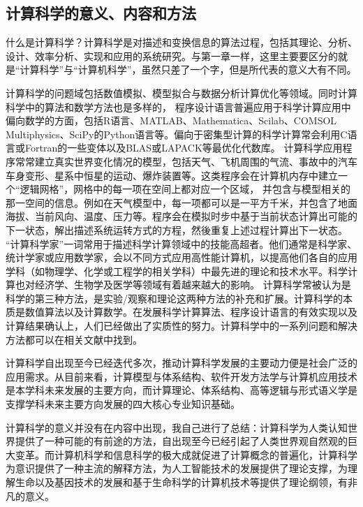 \documentclass{article}
\begin{document}
\subsection{计算科学的意义、内容和方法}
什么是计算科学？计算科学是对描述和变换信息的算法过程，包括其理论、分析、设计、效率分析、实现和应用的系统研究。与第一章一样，这里主要要区分的就是“计算科学”与“计算机科学”，虽然只差了一个字，但是所代表的意义大有不同。\par
计算科学的问题域包括数值模拟、模型拟合与数据分析计算优化等领域。同时计算科学中的算法和数学方法也是多样的，
程序设计语言普遍应用于科学计算应用中偏向数学的方面，包括R语言、MATLAB、Mathematica、Scilab、COMSOL Multiphysics、SciPy的Python语言等。偏向于密集型计算的科学计算常会利用C语言或Fortran的一些变体以及BLAS或LAPACK等最优化代数库。
计算科学应用程序常常建立真实世界变化情况的模型，包括天气、飞机周围的气流、事故中的汽车车身变形、星系中恒星的运动、爆炸装置等。这类程序会在计算机内存中建立一个“逻辑网格”，网格中的每一项在空间上都对应一个区域，
并包含与模型相关的那一空间的信息。例如在天气模型中，每一项都可以是一平方千米，并包含了地面海拔、当前风向、温度、压力等。程序会在模拟时步中基于当前状态计算出可能的下一状态，解出描述系统运转方式的方程，然後重复上述过程计算出下一状态。
“计算科学家”一词常用于描述科学计算领域中的技能高超者。他们通常是科学家、统计学家或应用数学家，会以不同方式应用高性能计算机，以提高他们各自的应用学科（如物理学、化学或工程学的相关学科）中最先进的理论和技术水平。科学计算也对经济学、生物学及医学等领域有着越来越大的影响。
计算科学常被认为是科学的第三种方法，是实验/观察和理论这两种方法的补充和扩展。计算科学的本质是数值算法以及计算数学。在发展科学计算算法、程序设计语言的有效实现以及计算结果确认上，人们已经做出了实质性的努力。计算科学中的一系列问题和解决方法都可以在相关文献中找到。\citep{zxx}\par
计算科学自出现至今已经迭代多次，推动计算科学发展的主要动力便是社会广泛的应用需求。从目前来看，计算模型与体系结构、软件开发方法学与计算机应用技术是本学科未来发展的主要方向，而计算理论、体系结构、高等逻辑与形式语义学是支撑学科未来主要方向发展的四大核心专业知识基础。\par
计算科学的意义并没有在内容中出现，我自己进行了总结：计算科学为人类认知世界提供了一种可能的有前途的方法，自出现至今已经引起了人类世界观自然观的巨大变革。而计算机科学和信息科学的极大成就促进了计算概念的普遍化，计算科学为意识提供了一种主流的解释方法，为人工智能技术的发展提供了理论支撑，为理解生命以及基因技术的发展和基于生命科学的计算机技术等提供了理论纲领，有非凡的意义。\par


\end{document}
